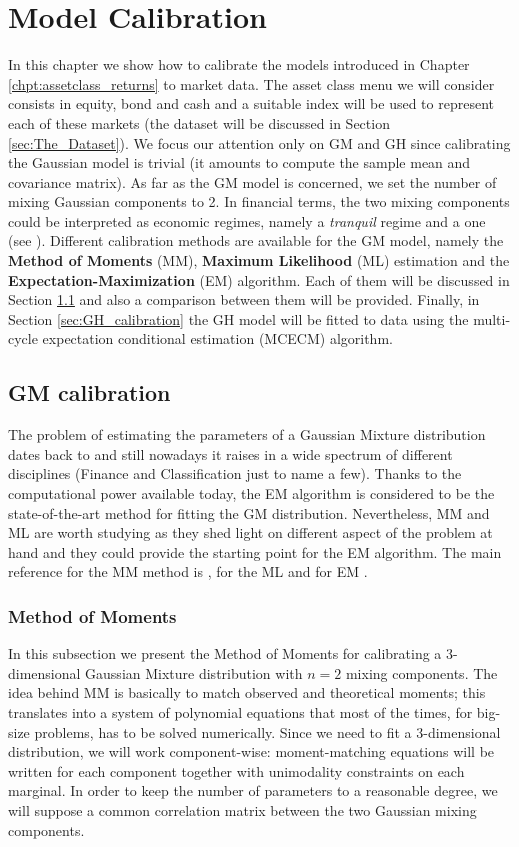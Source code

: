 \chapter{Model Calibration}\label{chpt:calibration}
In this chapter we show how to calibrate the models introduced in Chapter \ref{chpt:assetclass_returns} to market data. The asset class menu we will consider consists in equity, bond and cash and a suitable index will be used to represent each of these markets (the dataset will be discussed in Section \ref{sec:The_Dataset}). We focus our attention only on GM and GH since calibrating the Gaussian model is trivial (it amounts to compute the sample mean and covariance matrix). As far as the GM model is concerned, we set the number of mixing Gaussian components to 2. In financial terms, the two mixing components could be interpreted as economic regimes, namely a \textit{tranquil} regime and a  one (see \cite{Brey2013}). Different calibration methods are available for the GM model, namely the \textbf{Method of Moments} (MM), \textbf{Maximum Likelihood} (ML) estimation  and the \textbf{Expectation-Maximization} (EM) algorithm. Each of them will be discussed in Section \ref{sec:GM_calibration} and also a comparison between them will be provided. Finally, in Section \ref{sec:GH_calibration} the GH model will be fitted to data using the multi-cycle expectation conditional estimation (MCECM) algorithm. 
\section{GM calibration} \label{sec:GM_calibration}
The problem of estimating the parameters of a Gaussian Mixture distribution dates back to \cite{Pearson1894} and still nowadays it raises in a wide spectrum of different disciplines (Finance and Classification just to name a few). Thanks to the computational power available today, the EM algorithm is considered to be the state-of-the-art method for fitting the GM distribution. Nevertheless, MM and ML are worth studying as they shed light on different aspect of the problem at hand and they could provide the starting point for the EM algorithm. The main reference for the MM method is \cite{Everitt81}, for the ML \cite{casella2002} and for EM \cite{McNeil2005}.
\subsection{Method of Moments}\label{subsec:MM}
In this subsection we present the Method of Moments for calibrating a 3-dimensional Gaussian Mixture distribution with $n=2$ mixing components. The idea behind MM is basically to match observed and theoretical moments; this translates into a system of polynomial equations that most of the times, for big-size problems, has to be solved numerically. Since we need to fit a 3-dimensional distribution, we will work component-wise: moment-matching equations will be written  for each component together with unimodality constraints on each marginal. In order to keep the number of parameters to a reasonable degree, we will suppose a common correlation matrix between the two Gaussian mixing components.

